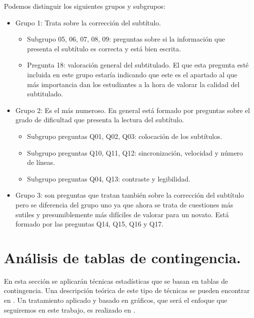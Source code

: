 \documentclass[
  12pt,
  a4paper,
  extrafontsizes,
  onecolumn,
  openright]{memoir}
\providecommand{\tightlist}{%
  \setlength{\itemsep}{0pt}\setlength{\parskip}{0pt}}\usepackage{longtable,booktabs,array}
\begin{document}
Podemos distinguir los siguientes grupos y subgrupos:

\begin{itemize}
\tightlist
\item
  Grupo 1: Trata sobre la corrección del subtítulo.

  \begin{itemize}
  \tightlist
  \item
    Subgrupo 05, 06, 07, 08, 09: preguntas sobre si la información que
    presenta el subtítulo es correcta y está bien escrita.
  \item
    Pregunta 18: valoración general del subtitulado. El que esta
    pregunta esté incluida en este grupo estaría indicando que este es
    el apartado al que más importancia dan los estudiantes a la hora de
    valorar la calidad del subtitulado.
  \end{itemize}
\item
  Grupo 2: Es el más numeroso. En general está formado por preguntas
  sobre el grado de dificultad que presenta la lectura del subtítulo.

  \begin{itemize}
  \tightlist
  \item
    Subgrupo preguntas Q01, Q02, Q03: colocación de los subtítulos.
  \item
    Subgrupo preguntas Q10, Q11, Q12: sincronización, velocidad y número
    de líneas.
  \item
    Subgrupo preguntas Q04, Q13: contraste y legibilidad.
  \end{itemize}
\item
  Grupo 3: son preguntas que tratan también sobre la corrección del
  subtítulo pero se diferencia del grupo uno ya que ahora se trata de
  cuestiones más sutiles y presumiblemente más difíciles de valorar para
  un novato. Está formado por las preguntas Q14, Q15, Q16 y Q17.
\end{itemize}

\hypertarget{anuxe1lisis-de-tablas-de-contingencia.}{%
\section{Análisis de tablas de
contingencia.}\label{anuxe1lisis-de-tablas-de-contingencia.}}

En esta sección se aplicarán técnicas estadísticas que se basan en
tablas de contingencia. Una descripción teórica de este tipo de técnicas
se pueden encontrar en \textcite{agresti_2018}. Un tratamiento aplicado
y basado en gráficos, que será el enfoque que seguiremos en este
trabajo, es realizado en \textcite{frienly2015}.
\end{document}
